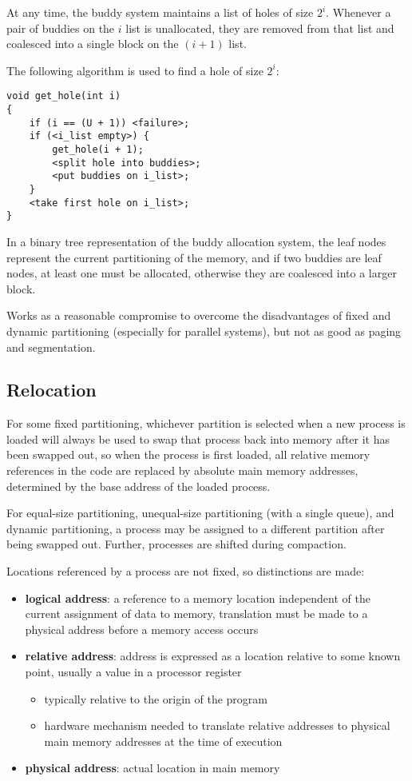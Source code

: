 \documentclass[11pt]{article}
\begin{document}
At any time, the buddy system maintains a list of holes of size \(2^{i}\).
Whenever a pair of buddies on the \(i\) list is unallocated, they are removed from
that list and coalesced into a single block on the \((i+1)\) list.

The following algorithm is used to find a hole of size \(2^{i}\):
\begin{verbatim}
void get_hole(int i)
{
    if (i == (U + 1)) <failure>;
    if (<i_list empty>) {
        get_hole(i + 1);
        <split hole into buddies>;
        <put buddies on i_list>;
    }
    <take first hole on i_list>;
}
\end{verbatim}

In a binary tree representation of the buddy allocation system, the leaf nodes
represent the current partitioning of the memory, and if two buddies are leaf nodes,
at least one must be allocated, otherwise they are coalesced into a larger block.

Works as a reasonable compromise to overcome the disadvantages of fixed and dynamic
partitioning (especially for parallel systems), but not as good as paging and
segmentation.
\subsection{Relocation}
\label{sec:org48a329c}
For some fixed partitioning, whichever partition is selected when a new process is loaded
will always be used to swap that process back into memory after it has been swapped out,
so when the process is first loaded, all relative memory references in the code are
replaced by absolute main memory addresses, determined by the base address of the loaded
process.

For equal-size partitioning, unequal-size partitioning (with a single queue), and dynamic
partitioning, a process may be assigned to a different partition after being swapped out.
Further, processes are shifted during compaction.

Locations referenced by a process are not fixed, so distinctions are made:
\begin{itemize}
\item \textbf{logical address}: a reference to a memory location independent of the current
assignment of data to memory, translation must be made to a physical address before
a memory access occurs
\item \textbf{relative address}: address is expressed as a location relative to some known point,
usually a value in a processor register
\begin{itemize}
\item typically relative to the origin of the program
\item hardware mechanism needed to translate relative addresses to physical main memory
addresses at the time of execution
\end{itemize}
\item \textbf{physical address}: actual location in main memory
\end{itemize}
\end{document}
